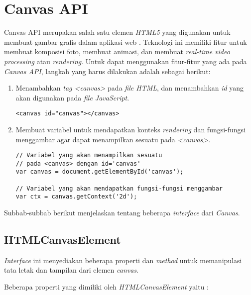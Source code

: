 
 

\section{Canvas API}
\label{sec:Canvas API}
 
Canvas API merupakan salah satu elemen \textit{HTML5} yang digunakan untuk membuat gambar grafis dalam aplikasi web \cite{canvas}. Teknologi ini memiliki fitur untuk membuat komposisi foto, membuat animasi, dan membuat \textit{real-time video processing} atau \textit{rendering}. Untuk dapat menggunakan fitur-fitur yang ada pada \textit{Canvas API}, langkah yang harus dilakukan adalah sebagai berikut:
\begin{enumerate}
	\item Menambahkan \textit{tag <canvas>} pada \textit{file HTML}, dan menambahkan \textit{id} yang akan digunakan pada \textit{file JavaScript}.
\begin{lstlisting}
<canvas id="canvas"></canvas>
\end{lstlisting}
	
	\item Membuat variabel untuk mendapatkan konteks \textit{rendering} dan fungsi-fungsi menggambar agar dapat menampilkan sesuatu pada \textit{<canvas>}.
\begin{lstlisting}
// Variabel yang akan menampilkan sesuatu 
// pada <canvas> dengan id='canvas'
var canvas = document.getElementById('canvas'); 
	
// Variabel yang akan mendapatkan fungsi-fungsi menggambar 
var ctx = canvas.getContext('2d');
\end{lstlisting}
\end{enumerate}

Subbab-subbab berikut menjelaskan tentang beberapa \textit{interface} dari \textit{Canvas}.

\subsection{HTMLCanvasElement}
\textit{Interface} ini menyediakan beberapa properti dan \textit{method} untuk memanipulasi tata letak dan tampilan dari elemen \textit{canvas}.

Beberapa properti yang dimiliki oleh \textit{HTMLCanvasElement} yaitu : 

